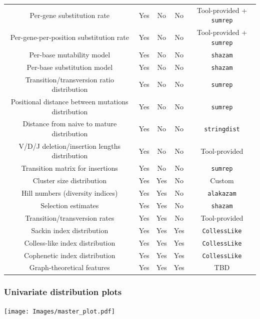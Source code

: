 \documentclass[mathserif,compress]{beamer}
\renewcommand\;{\,}
\begin{document}
\begin{frame}
\begin{tabular}{c|c|c|c|c}
Per-gene substitution rate & Yes & No & No & Tool-provided + \texttt{sumrep} \\
Per-gene-per-position substitution rate & Yes & No & No & Tool-provided + \texttt{sumrep} \\
Per-base mutability model & Yes & No & No & \texttt{shazam} \\
Per-base substitution model & Yes & No & No & \texttt{shazam} \\
Transition/transversion ratio distribution & Yes & No & No & \texttt{sumrep} \\
Positional distance between mutations distribution & Yes & No & No & \texttt{sumrep}  \\
Distance from naive to mature distribution & Yes & No & No & \texttt{stringdist} \\
V/D/J deletion/insertion lengths distribution & Yes & No & No & Tool-provided \\
Transition matrix for insertions & Yes & No & No & \texttt{sumrep} \\
\hline
Cluster size distribution & Yes & Yes & No & Custom \\
Hill numbers (diversity indices) & Yes & Yes & No & \texttt{alakazam} \\
Selection estimates & Yes & Yes & No & \texttt{shazam} \\
Transition/transversion rates & Yes & Yes & No & Tool-provided \\
\hline
Sackin index distribution & Yes & Yes & Yes & \texttt{CollessLike} \\
Colless-like index distribution & Yes & Yes & Yes & \texttt{CollessLike} \\
Cophenetic index distribution & Yes & Yes & Yes & \texttt{CollessLike} \\
Graph-theoretical features & Yes & Yes & Yes & TBD \\
\end{tabular}
\end{frame}

\begin{frame}\frametitle{Univariate distribution plots}
\begin{center}
\texttt{[image: Images/master\_plot.pdf]}
\end{center}
\end{frame}
\end{document}
